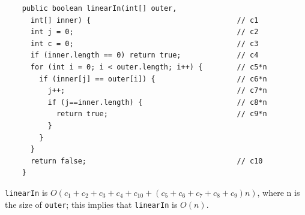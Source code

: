 \documentclass[a4paper,12pt]{article}
\begin{document}
\begin{enumerate}
\begin{Verbatim}
    public boolean linearIn(int[] outer,
      int[] inner) {                                  // c1
      int j = 0;                                      // c2
      int c = 0;                                      // c3
      if (inner.length == 0) return true;             // c4
      for (int i = 0; i < outer.length; i++) {        // c5*n
        if (inner[j] == outer[i]) {                   // c6*n
          j++;                                        // c7*n
          if (j==inner.length) {                      // c8*n
            return true;                              // c9*n
          }
        }
      }
      return false;                                   // c10
    }
    \end{Verbatim}
    \texttt{linearIn} is $O(c_1+c_2+c_3+c_4+c_10+(c_5+c_6+c_7+c_8+c_9)n)$, where n is the size of \texttt{outer};
    this implies that \texttt{linearIn} is $O(n)$.


\end{enumerate}
\end{document}
